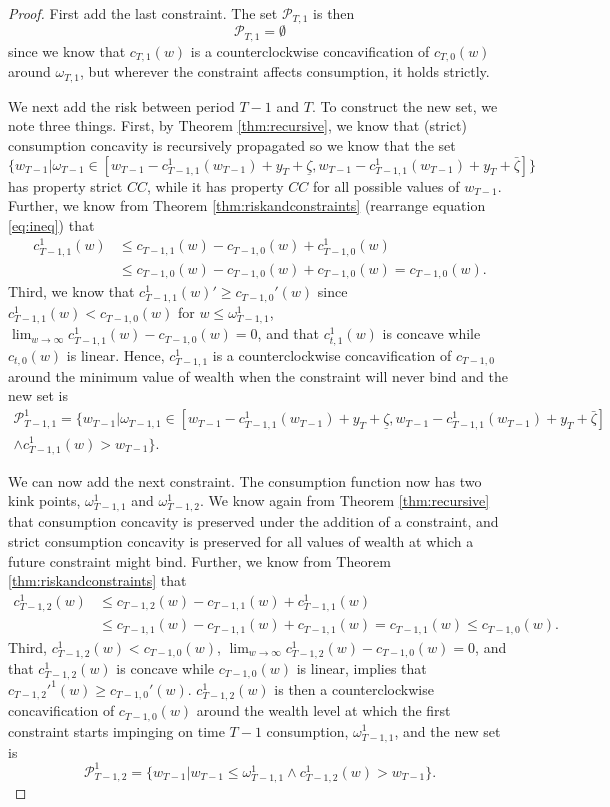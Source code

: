 \documentclass[titlepage]{\econtex}
\providecommand{\wAlt}{\omega}
\begin{document}
\begin{proof}
	First add the last constraint. The set $\mathcal{P}_{T,1}$ is then 
	\[\mathcal{P}_{T,1} = \emptyset \]
    since we know that $c_{T,1}(w)$ is a counterclockwise concavification of $c_{T,0}(w)$ around $\wAlt_{T,1}$, but wherever the constraint affects consumption, it holds strictly. 
	
	We next add the risk between period $T-1$ and $T$. To construct the new set, we note three things. First, by Theorem \ref{thm:recursive}, we know that (strict) consumption concavity is recursively propagated so we know that the set 
	\[\{w_{T-1} | \wAlt_{T-1} \in \left[w_{T-1} - c_{T-1,1}^1(w_{T-1}) + {y}_{T} + \underline{\zeta} ,w_{T-1} - c_{T-1,1}^1(w_{T-1}) + {y}_{T} + \bar{\zeta}\right] \}\]
	has property strict $CC$, while it has property $CC$ for all possible values of $w_{T-1}$. Further, we know from Theorem \ref{thm:riskandconstraints} (rearrange equation \eqref{eq:ineq}) that
	\begin{align*}{c}_{T-1,1}^1(w)  & \leq c_{T-1,1}(w) - c_{T-1,0}(w) + {c}_{T-1,0}^1(w) \\ &\leq c_{T-1,0}(w) - c_{T-1,0}(w) + c_{T-1,0}(w) = c_{T-1,0}(w).\end{align*}
	Third, we know that $c_{T-1,1}^{1}(w)' \geq c_{T-1,0}'(w)$ since ${c}_{T-1,1}^1(w) < c_{T-1,0}(w)$ for $w \leq \wAlt_{T-1,1}^1$, $\lim_{w\rightarrow \infty} c_{T-1,1}^1(w) - c_{T-1,0}(w) = 0$, and that $c_{t,1}^1(w)$ is concave while $c_{t,0}(w)$ is linear. Hence, $c_{T-1,1}^1$ is a counterclockwise concavification of $c_{T-1,0}$ around the minimum value of wealth when the constraint will never bind and the new set is
	\begin{align*}\mathcal{P}_{T-1,1}^1 = \{w_{T-1} | \wAlt_{T-1,1} \in \left[w_{T-1} - c_{T-1,1}^1(w_{T-1}) + {y}_{T} + \underline{\zeta}, w_{T-1} - c_{T-1,1}^1(w_{T-1}) + {y}_{T} + \bar{\zeta}\right]   \\ \wedge c_{T-1,1}^1(w) > w_{T-1}\}.\end{align*}
	
	We can now add the next constraint. The consumption function now has two kink points, $\wAlt_{T-1,1}^1$ and $\wAlt_{T-1,2}^1$. We know again from Theorem \ref{thm:recursive} that consumption concavity is preserved under the addition of a constraint, and strict consumption concavity is preserved for all values of wealth at which a future constraint might bind. Further, we know from Theorem \ref{thm:riskandconstraints} that 
		\begin{align*}c_{T-1,2}^1(w) &\leq c_{T-1,2}(w) - c_{T-1,1}(w) + c_{T-1,1}^1(w) \\ &\leq c_{T-1,1}(w) - c_{T-1,1}(w) + c_{T-1,1}(w) = c_{T-1,1}(w) \leq c_{T-1,0}(w). \end{align*}
	Third, $c_{T-1,2}^1(w) < c_{T-1,0}(w)$,  $\lim_{w\rightarrow\infty} c_{T-1,2}^1(w) - c_{T-1,0}(w) = 0$, and that $c_{T-1,2}^1(w)$ is concave while $c_{T-1,0}(w)$ is linear, implies that $c_{T-1,2}'^{1}(w) \geq c_{T-1,0}'(w)$. $c_{T-1,2}^1(w)$ is then a counterclockwise concavification of $c_{T-1,0}(w)$ around the wealth level at which the first constraint starts impinging on time $T-1$ consumption, $\wAlt_{T-1,1}^1$, and the new set is
	\[\mathcal{P}_{T-1,2}^1 = \{w_{T-1}| w_{T-1} \leq \wAlt_{T-1,1}^1 \wedge c_{T-1,2}^1(w) > w_{T-1} \}.\]
	

\end{proof}
\end{document}
